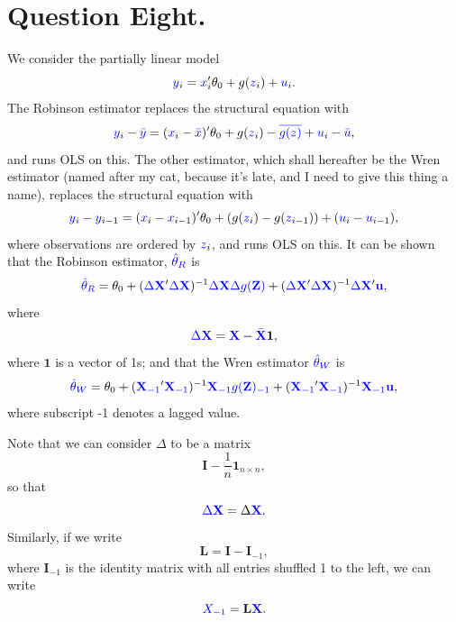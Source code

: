\documentclass{article}
\renewcommand{\vec}[1]{\mathbf{#1}}
\renewcommand{\r}[1]{\textcolor{blue}{#1}}
\begin{document}
\section{Question Eight.}
We consider the partially linear model
\begin{equation} \r{y}_{i} = \r{x}_{i}'\theta_{0}+g(\r{z}_{i})+\r{u}_{i}.\end{equation}
The Robinson estimator replaces the structural equation with
\begin{equation} \r{y}_{i}-\r{\bar{y}}=(\r{x}_{i}-\r{\bar{x}})'\theta_{0}+g(\r{z}_{i})-\r{\overline{g(z)}}+\r{u}_{i}-\r{\bar{u}},\end{equation}
and runs OLS on this. The other estimator, which shall hereafter be the Wren estimator (named after my cat, because it's late, and I need to give this thing a name), replaces the structural equation with
\begin{equation} \r{y}_{i}-\r{y}_{i-1}=(\r{x}_{i}-\r{x}_{i-1})'\theta_{0}+(g(\r{z}_{i})-g(\r{z}_{i-1}))+(\r{u}_{i}-\r{u}_{i-1}),\end{equation}
where observations are ordered by $\r{z}_{i}$, and runs OLS on this. It can be shown that the Robinson estimator, $\r{\hat{\theta}_{R}}$ is
\begin{equation} \r{\hat{\theta}_{R}} = \theta_{0}+(\r{\Delta \vec{X}}'\r{\Delta \vec{X}})^{-1}\r{\Delta \vec{X}}\r{\Delta g(\vec{Z})}+(\r{\Delta \vec{X}}'\r{\Delta \vec{X}})^{-1}\r{\Delta \vec{X}}'\r{\vec{u}},\end{equation}
where
\begin{equation} \r{\Delta \vec{X}} = \r{\vec{X}}-\r{\bar{\vec{X}}}\vec{1},\end{equation}
where $\vec{1}$ is a vector of 1s; and that the Wren estimator $\r{\hat{\theta}_{W}}$ is
\begin{equation} \r{\hat{\theta}_{W}} = \theta_{0} + (\r{\vec{X}_{-1}}'\r{\vec{X}_{-1}})^{-1}\r{\vec{X}_{-1}}\r{g(\vec{Z})_{-1}} + (\r{\vec{X}_{-1}}'\r{\vec{X}_{-1}})^{-1}\r{\vec{X}_{-1}}\r{\vec{u}},\end{equation}
where subscript -1 denotes a lagged value.

Note that we can consider $\Delta$ to be a matrix
\begin{equation} \vec{I} - \frac{1}{n}\vec{1}_{n\times n},\end{equation}
so that 
\begin{equation} \r{\Delta \vec{X}} = \Delta\r{\vec{X}}.\end{equation}
Similarly, if we write 
\begin{equation} \vec{L} = \vec{I} - \vec{I}_{-1},\end{equation}
where $\vec{I}_{-1}$ is the identity matrix with all entries shuffled 1 to the left, we can write
\begin{equation} \r{X_{-1}}=\vec{L}\r{\vec{X}}.\end{equation} 
\end{document}
